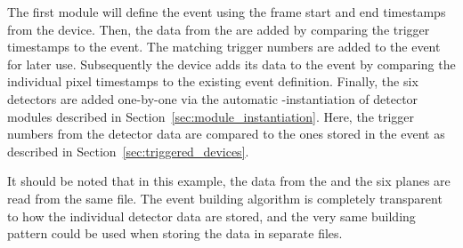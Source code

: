 The first module will define the event using the frame start and end timestamps from the  device.
Then, the data from the  are added by comparing the trigger timestamps to the event.
The matching trigger numbers are added to the event for later use.
Subsequently the  device adds its data to the event by comparing the individual pixel timestamps to the existing event definition.
Finally, the six  detectors are added one-by-one via the automatic -instantiation of detector modules described in Section~\ref{sec:module_instantiation}.
Here, the trigger numbers from the detector data are compared to the ones stored in the event as described in Section~\ref{sec:triggered_devices}.

It should be noted that in this example, the data from the  and the six  planes are read from the same file.
The event building algorithm is completely transparent to how the individual detector data are stored, and the very same building pattern could be used when storing the data in separate files.

